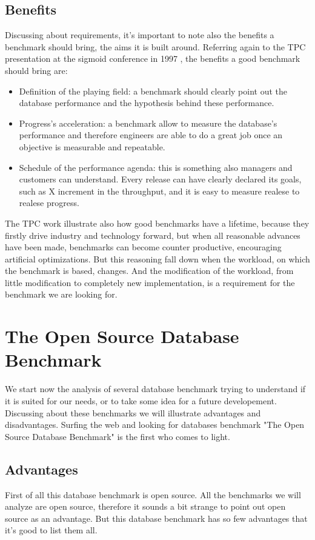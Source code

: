 		\subsection{Benefits}
Discussing about requirements, it's important to note also the benefits a benchmark should bring, the aims it is built around. Referring again to the TPC presentation at the sigmoid conference in 1997 \cite{tpc/sigmoid}, the benefits a good benchmark should bring are:
\begin{itemize}
	\item Definition of the playing field: a benchmark should clearly point out the database performance and the hypothesis behind these performance.
	\item Progress's acceleration: a benchmark allow to measure the database's performance and therefore engineers are able to do a great job once an objective is measurable and repeatable.
	\item Schedule of the performance agenda: this is something also managers and customers can understand. Every release can have clearly declared its goals, such as X increment in the throughput, and it is easy to measure realese to realese progress.
\end{itemize}

The TPC work illustrate also how good benchmarks have a lifetime, because they firstly drive industry and technology forward, but when all reasonable advances have been made, benchmarks can become counter productive, encouraging artificial optimizations. But this reasoning fall down when the workload, on which the benchmark is based, changes. And the modification of the workload, from little modification to completely new implementation, is a requirement for the benchmark we are looking for.
	
	\section{The Open Source Database Benchmark}
We start now the analysis of several database benchmark trying to understand if it is suited for our needs, or to take some idea for a future developement. Discussing about these benchmarks we will illustrate advantages and disadvantages. Surfing the web and looking for databases benchmark "The Open Source Database Benchmark" is the first who comes to light. 

		\subsection{Advantages}
First of all this database benchmark is open source. All the benchmarks we will analyze are open source, therefore it sounds a bit strange to point out open source as an advantage. But this database benchmark has so few advantages that it's good to list them all.

